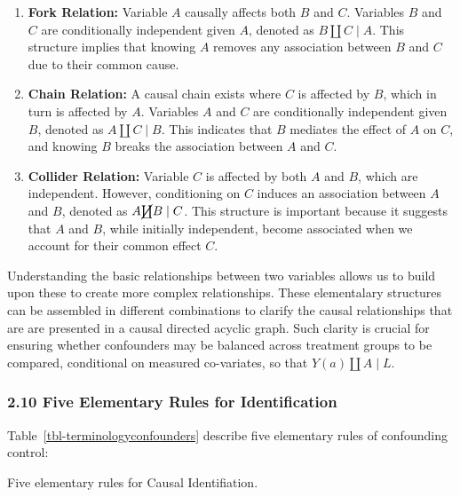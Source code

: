 \documentclass[
  single column]{article}
\providecommand{\tightlist}{%
  \setlength{\itemsep}{0pt}\setlength{\parskip}{0pt}}\usepackage{longtable,booktabs,array}
\begin{document}
\begin{enumerate}
\def\labelenumi{\arabic{enumi}.}
\setcounter{enumi}{2}
\tightlist
\item
  \textbf{Fork Relation:} Variable \(A\) causally affects both \(B\) and
  \(C\). Variables \(B\) and \(C\) are conditionally independent given
  \(A\), denoted as \(B \coprod C \mid A\). This structure implies that
  knowing \(A\) removes any association between \(B\) and \(C\) due to
  their common cause.
\item
  \textbf{Chain Relation:} A causal chain exists where \(C\) is affected
  by \(B\), which in turn is affected by \(A\). Variables \(A\) and
  \(C\) are conditionally independent given \(B\), denoted as
  \(A \coprod C \mid B\). This indicates that \(B\) mediates the effect
  of \(A\) on \(C\), and knowing \(B\) breaks the association between
  \(A\) and \(C\).
\item
  \textbf{Collider Relation:} Variable \(C\) is affected by both \(A\)
  and \(B\), which are independent. However, conditioning on \(C\)
  induces an association between \(A\) and \(B\), denoted as
  \(A \cancel{\coprod} B \mid C\). This structure is important because
  it suggests that \(A\) and \(B\), while initially independent, become
  associated when we account for their common effect \(C\).
\end{enumerate}

Understanding the basic relationships between two variables allows us to
build upon these to create more complex relationships. These
elementalary structures can be assembled in different combinations to
clarify the causal relationships that are are presented in a causal
directed acyclic graph. Such clarity is crucial for ensuring whether
confounders may be balanced across treatment groups to be compared,
conditional on measured co-variates, so that \(Y(a) \coprod A \mid L\).

\newpage{}

\subsubsection{2.10 Five Elementary Rules for
Identification}\label{five-elementary-rules-for-identification}

Table~\ref{tbl-terminologyconfounders} describe five elementary rules of
confounding control:

\begin{table}

\caption{\label{tbl-terminologyconfounders}Five elementary rules for
Causal Identifiation.}

\centering{

\terminologyelconfounders

}

\end{table}%
\end{document}
